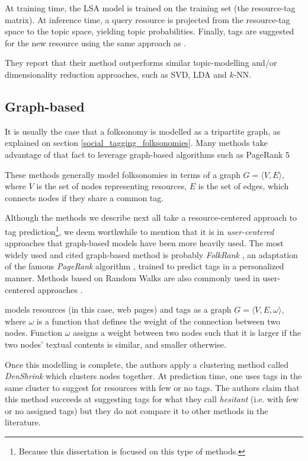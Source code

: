 At training time, the LSA model is trained on the training set (the resource-tag matrix). At inference time, a query resource is projected from the resource-tag space to the topic space, yielding topic probabilities. Finally, tags are suggested for the new resource using the same approach as \cite{si_sun_2008}.

They report that their method outperforms similar topic-modelling and/or dimensionality reduction approaches, such as SVD, LDA and $k$-NN.

\subsection{Graph-based}

It is usually the case that a folksonomy is modelled as a tripartite graph, as explained on section \ref{social_tagging_folksonomies}. Many methods take advantage of that fact to leverage graph-based algorithms such as PageRank 5

These methods generally model folksonomies in terms of a graph $G=\langle V,E \rangle$, where $V$ is the set of nodes representing resources, $E$ is the set of edges, which connects nodes if they share a common tag.

Although the methods we describe next all take a resource-centered approach to tag prediction\footnote{Because this dissertation is focused on this type of methods.}, we deem worthwhile to mention that it is in \textit{user-centered} approaches that graph-based models have been more heavily used. The most widely used and cited graph-based method is probably \textit{FolkRank} \citep{jaeschke_etal_2007}, an adaptation of the famous \textit{PageRank} algorithm \citep{page_etal_1999}, trained to predict tags in a personalized manner. Methods based on Random Walks are also commonly used in user-centered approaches \citep{mrosek_etal_2009,si_etal_2009,jin_etal_2010}.   

\cite{wang_etal_2015} models resources (in this case, web pages) and tags as a graph $G=\langle V,E,\omega \rangle$, where $\omega$ is a function that defines the weight of the connection between two nodes. Function $\omega$ assigns a weight between two nodes such that it is larger if the two nodes' textual contents is similar, and smaller otherwise.

Once this modelling is complete, the authors apply a clustering method called \textit{DenShrink} \citep{huang_etal_2011} which clusters nodes together. At prediction time, one uses tags in the same cluster to suggest for resources with few or no tags. The authors claim that this method succeeds at suggesting tags for what they call \textit{hesitant} (i.e. with few or no assigned tags) but they do not compare it to other methods in the literature.

